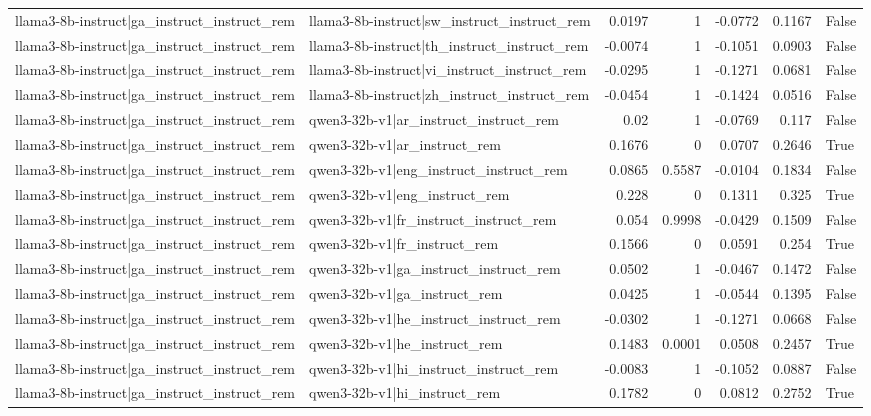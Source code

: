 \begin{table}
\begin{tabular}{l l r r r r l}
llama3-8b-instruct|ga_instruct_instruct_rem & llama3-8b-instruct|sw_instruct_instruct_rem & 0.0197 & 1 & -0.0772 & 0.1167 & False \\
llama3-8b-instruct|ga_instruct_instruct_rem & llama3-8b-instruct|th_instruct_instruct_rem & -0.0074 & 1 & -0.1051 & 0.0903 & False \\
llama3-8b-instruct|ga_instruct_instruct_rem & llama3-8b-instruct|vi_instruct_instruct_rem & -0.0295 & 1 & -0.1271 & 0.0681 & False \\
llama3-8b-instruct|ga_instruct_instruct_rem & llama3-8b-instruct|zh_instruct_instruct_rem & -0.0454 & 1 & -0.1424 & 0.0516 & False \\
llama3-8b-instruct|ga_instruct_instruct_rem & qwen3-32b-v1|ar_instruct_instruct_rem & 0.02 & 1 & -0.0769 & 0.117 & False \\
llama3-8b-instruct|ga_instruct_instruct_rem & qwen3-32b-v1|ar_instruct_rem & 0.1676 & 0 & 0.0707 & 0.2646 & True \\
llama3-8b-instruct|ga_instruct_instruct_rem & qwen3-32b-v1|eng_instruct_instruct_rem & 0.0865 & 0.5587 & -0.0104 & 0.1834 & False \\
llama3-8b-instruct|ga_instruct_instruct_rem & qwen3-32b-v1|eng_instruct_rem & 0.228 & 0 & 0.1311 & 0.325 & True \\
llama3-8b-instruct|ga_instruct_instruct_rem & qwen3-32b-v1|fr_instruct_instruct_rem & 0.054 & 0.9998 & -0.0429 & 0.1509 & False \\
llama3-8b-instruct|ga_instruct_instruct_rem & qwen3-32b-v1|fr_instruct_rem & 0.1566 & 0 & 0.0591 & 0.254 & True \\
llama3-8b-instruct|ga_instruct_instruct_rem & qwen3-32b-v1|ga_instruct_instruct_rem & 0.0502 & 1 & -0.0467 & 0.1472 & False \\
llama3-8b-instruct|ga_instruct_instruct_rem & qwen3-32b-v1|ga_instruct_rem & 0.0425 & 1 & -0.0544 & 0.1395 & False \\
llama3-8b-instruct|ga_instruct_instruct_rem & qwen3-32b-v1|he_instruct_instruct_rem & -0.0302 & 1 & -0.1271 & 0.0668 & False \\
llama3-8b-instruct|ga_instruct_instruct_rem & qwen3-32b-v1|he_instruct_rem & 0.1483 & 0.0001 & 0.0508 & 0.2457 & True \\
llama3-8b-instruct|ga_instruct_instruct_rem & qwen3-32b-v1|hi_instruct_instruct_rem & -0.0083 & 1 & -0.1052 & 0.0887 & False \\
llama3-8b-instruct|ga_instruct_instruct_rem & qwen3-32b-v1|hi_instruct_rem & 0.1782 & 0 & 0.0812 & 0.2752 & True \\

\end{tabular}
\end{table}
